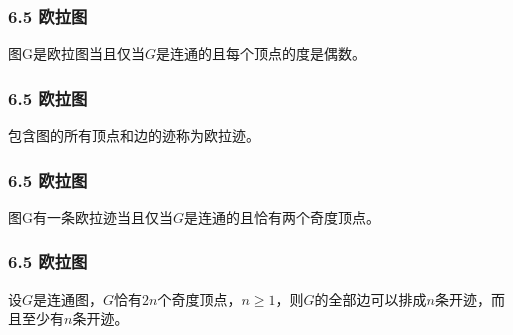 \documentclass{beamer}
\begin{document}
\begin{CJK*}{UTF8}{gbsn}
\begin{frame}
\end{frame}


\begin{frame}
  \frametitle{6.5 欧拉图}
  \begin{theorem6.5.1}
    图G是欧拉图当且仅当$G$是连通的且每个顶点的度是偶数。
  \end{theorem6.5.1}

\end{frame}

\begin{frame}
  \frametitle{6.5 欧拉图}
  \begin{definition6.5.2}
    包含图的所有顶点和边的迹称为欧拉迹。
  \end{definition6.5.2}

\end{frame}

\begin{frame}
  \frametitle{6.5 欧拉图}
  \begin{theorem6.5.2}
    图G有一条欧拉迹当且仅当$G$是连通的且恰有两个奇度顶点。
  \end{theorem6.5.2}

\end{frame}


\begin{frame}
  \frametitle{6.5 欧拉图}
  \begin{theorem6.5.3}
    设$G$是连通图，$G$恰有$2n$个奇度顶点，$n \geq 1$，则$G$的全部边可以排成$n$条开迹，而且至少有$n$条开迹。
  \end{theorem6.5.3}

\end{frame}



\end{CJK*}
\end{document}
